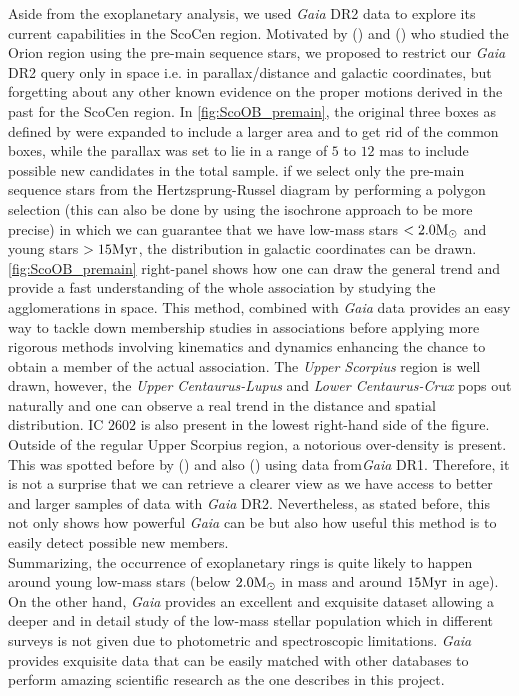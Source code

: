 Aside from the exoplanetary analysis, we used \textit{Gaia} DR2 data to explore its current capabilities in the ScoCen region. Motivated by  (\citeyear{Skrutskie06}) and  (\citeyear{Zari17}) who studied the Orion region using the pre-main sequence stars, we proposed to restrict our \textit{Gaia} DR2 query only in space i.e. in parallax/distance and galactic coordinates, but forgetting about any other known evidence on the proper motions derived in the past for the ScoCen region. In \autoref{fig:ScoOB_premain}, the original three boxes as defined by  \citeyear{Blaauw46} were expanded to include a larger area and to get rid of the common boxes, while the parallax was set to lie in a range of $5$ to $12$ mas to include possible new candidates in the total sample. if we select only the pre-main sequence stars from the Hertzsprung-Russel diagram by performing a polygon selection (this can also be done by using the isochrone approach to be more precise) in which we can guarantee that we have low-mass stars $< 2.0 \textnormal{M}_\odot$ and young stars $> 15 \textnormal{Myr}$, the distribution in galactic coordinates can be drawn. \autoref{fig:ScoOB_premain} right-panel shows how one can draw the general trend and provide a fast understanding of the whole association by studying the agglomerations in space. This method, combined with \textit{Gaia} data provides an easy way to tackle down membership studies in associations before applying more rigorous methods involving kinematics and dynamics enhancing the chance to obtain a member of the actual association. The \textit{Upper Scorpius} region is well drawn, however, the \textit{Upper Centaurus-Lupus} and \textit{Lower Centaurus-Crux} pops out naturally and one can observe a real trend in the distance and spatial distribution. IC $2602$ is also present in the lowest right-hand side of the figure. Outside of the regular Upper Scorpius region, a notorious over-density is present. This was spotted before by  (\citeyear{1999AJ....117..354D}) and also  (\citeyear{Mamajek2016}) using data from\textit{Gaia} DR1. Therefore, it is not a surprise that we can retrieve a clearer view as we have access to better and larger samples of data with \textit{Gaia} DR2. Nevertheless, as stated before, this not only shows how powerful \textit{Gaia} can be but also how useful this method is to easily detect possible new members.\\ 

Summarizing, the occurrence of exoplanetary rings is quite likely to happen around young low-mass stars (below $2.0\textnormal{M}_\odot$ in mass and around $15\textnormal{Myr}$ in age). On the other hand, \textit{Gaia} provides an excellent and exquisite dataset allowing a deeper and in detail study of the low-mass stellar population which in different surveys is not given due to photometric and spectroscopic limitations. \textit{Gaia} provides exquisite data that can be easily matched with other databases to perform amazing scientific research as the one describes in this project.      
